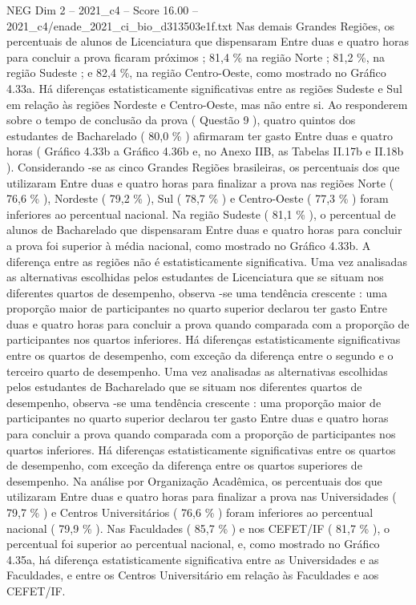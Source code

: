 \begin{textsample}{NEG Dim 2 – 2021\_c4 – Score 16.00 – 2021\_c4/enade\_2021\_ci\_bio\_d313503e1f.txt}
Nas demais Grandes Regiões, os percentuais de alunos de Licenciatura que dispensaram Entre duas e quatro horas para concluir a prova ficaram próximos ; 81,4 \% na região Norte ; 81,2 \%, na região Sudeste ; e 82,4 \%, na região Centro-Oeste, como mostrado no Gráfico 4.33a.
Há diferenças estatisticamente significativas entre as regiões Sudeste e Sul em relação às regiões Nordeste e Centro-Oeste, mas não entre si.
Ao responderem sobre o tempo de conclusão da prova ( Questão 9 ), quatro quintos dos estudantes de Bacharelado ( 80,0 \% ) afirmaram ter gasto Entre duas e quatro horas ( Gráfico 4.33b a Gráfico 4.36b e, no Anexo IIB, as Tabelas II.17b e II.18b ).
Considerando -se as cinco Grandes Regiões brasileiras, os percentuais dos que utilizaram Entre duas e quatro horas para finalizar a prova nas regiões Norte ( 76,6 \% ), Nordeste ( 79,2 \% ), Sul ( 78,7 \% ) e Centro-Oeste ( 77,3 \% ) foram inferiores ao percentual nacional.
Na região Sudeste ( 81,1 \% ), o percentual de alunos de Bacharelado que dispensaram Entre duas e quatro horas para concluir a prova foi superior à média nacional, como mostrado no Gráfico 4.33b.
A diferença entre as regiões não é estatisticamente significativa.
Uma vez analisadas as alternativas escolhidas pelos estudantes de Licenciatura que se situam nos diferentes quartos de desempenho, observa -se uma tendência crescente : uma proporção maior de participantes no quarto superior declarou ter gasto Entre duas e quatro horas para concluir a prova quando comparada com a proporção de participantes nos quartos inferiores.
Há diferenças estatisticamente significativas entre os quartos de desempenho, com exceção da diferença entre o segundo e o terceiro quarto de desempenho.
Uma vez analisadas as alternativas escolhidas pelos estudantes de Bacharelado que se situam nos diferentes quartos de desempenho, observa -se uma tendência crescente : uma proporção maior de participantes no quarto superior declarou ter gasto Entre duas e quatro horas para concluir a prova quando comparada com a proporção de participantes nos quartos inferiores.
Há diferenças estatisticamente significativas entre os quartos de desempenho, com exceção da diferença entre os quartos superiores de desempenho.
Na análise por Organização Acadêmica, os percentuais dos que utilizaram Entre duas e quatro horas para finalizar a prova nas Universidades ( 79,7 \% ) e Centros Universitários ( 76,6 \% ) foram inferiores ao percentual nacional ( 79,9 \% ).
Nas Faculdades ( 85,7 \% ) e nos CEFET/IF ( 81,7 \% ), o percentual foi superior ao percentual nacional, e, como mostrado no Gráfico 4.35a, há diferença estatisticamente significativa entre as Universidades e as Faculdades, e entre os Centros Universitário em relação às Faculdades e aos CEFET/IF.

\end{textsample}
